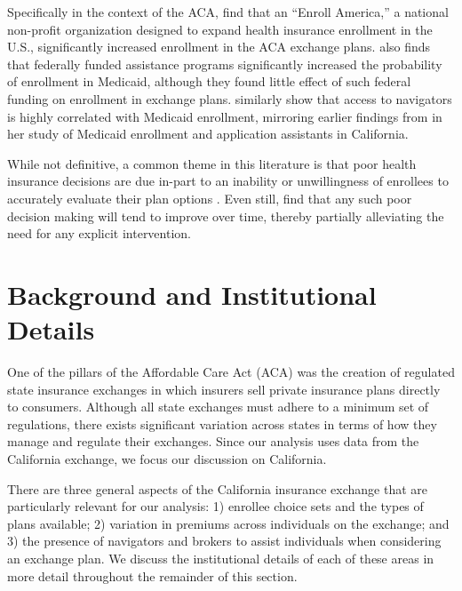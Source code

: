 \documentclass[12pt]{article}
\begin{document}
Specifically in the context of the ACA, \cite{orzol2018} find that an ``Enroll America,'' a national non-profit organization designed to expand health insurance enrollment in the U.S., significantly increased enrollment in the ACA exchange plans. \cite{myerson2019} also finds that federally funded assistance programs significantly increased the probability of enrollment in Medicaid, although they found little effect of such federal funding on enrollment in exchange plans. \cite{sommers2015} similarly show that access to navigators is highly correlated with Medicaid enrollment, mirroring earlier findings from \cite{aizer2003} in her study of Medicaid enrollment and application assistants in California.

\cite{aizawa2021}

While not definitive, a common theme in this literature is that poor health insurance decisions are due in-part to an inability or unwillingness of enrollees to accurately evaluate their plan options \citep{bhargava2017, hanoch2009}. Even still, \cite{ketcham2012} find that any such poor decision making will tend to improve over time, thereby partially alleviating the need for any explicit intervention. 


\section{Background and Institutional Details}
\label{sec:background}

One of the pillars of the Affordable Care Act (ACA) was the creation of regulated state insurance exchanges in which insurers sell private insurance plans directly to consumers. Although all state exchanges must adhere to a minimum set of regulations, there exists significant variation across states in terms of how they manage and regulate their exchanges. Since our analysis uses data from the California exchange, we focus our discussion on California.

There are three general aspects of the California insurance exchange that are particularly relevant for our analysis: 1) enrollee choice sets and the types of plans available; 2) variation in premiums across individuals on the exchange; and 3) the presence of navigators and brokers to assist individuals when considering an exchange plan. We discuss the institutional details of each of these areas in more detail throughout the remainder of this section.
\end{document}
